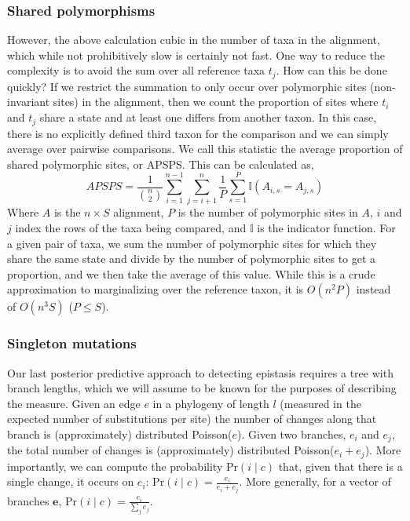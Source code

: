 \documentclass[11pt]{article}
\newcommand{\pr}{\text{Pr}}
\begin{document}
\subsubsection*{Shared polymorphisms}
However, the above calculation cubic in the number of taxa in the alignment, which while not prohibitively slow is certainly not fast.
One way to reduce the complexity is to avoid the sum over all reference taxa $t_j$.
How can this be done quickly?
If we restrict the summation to only occur over polymorphic sites (non-invariant sites) in the alignment, then we count the proportion of sites where $t_i$ and $t_j$ share a state and at least one differs from another taxon.
In this case, there is no explicitly defined third taxon for the comparison and we can simply average over pairwise comparisons.
We call this statistic the average proportion of shared polymorphic sites, or APSPS.
This can be calculated as,
\[
APSPS = \frac{1}{\binom{n}{2}} \sum_{i=1}^{n-1} \sum_{j=i+1}^n \frac{1}{P} \sum_{s=1}^P \mathbb{I}(A_{i,s} = A_{j,s})
\]
Where $A$ is the $n \times S$ alignment, $P$ is the number of polymorphic sites in $A$, $i$ and $j$ index the rows of the taxa being compared, and $\mathbb{I}$ is the indicator function.
For a given pair of taxa, we sum the number of polymorphic sites for which they share the same state and divide by the number of polymorphic sites to get a proportion, and we then take the average of this value.
While this is a crude approximation to marginalizing over the reference taxon, it is $O(n^2P)$ instead of $O(n^3S)$ ($P \leq S$).


\subsubsection*{Singleton mutations}
Our last posterior predictive approach to detecting epistasis requires a tree with branch lengths, which we will assume to be known for the purposes of describing the measure.
Given an edge $e$ in a phylogeny of length $l$ (measured in the expected number of substitutions per site) the number of changes along that branch is (approximately) distributed Poisson($e$).
Given two branches, $e_i$ and $e_j$, the total number of changes is (approximately) distributed Poisson($e_i + e_j$).
More importantly, we can compute the probability $\pr(i \mid c)$ that, given that there is a single change, it occurs on $e_i$: $\pr(i \mid c) = \frac{e_i}{e_i + e_j}$.
More generally, for a vector of branches $\boldsymbol{e}$, $\pr(i \mid c) = \frac{e_i}{\sum_j e_j}$.
\end{document}
